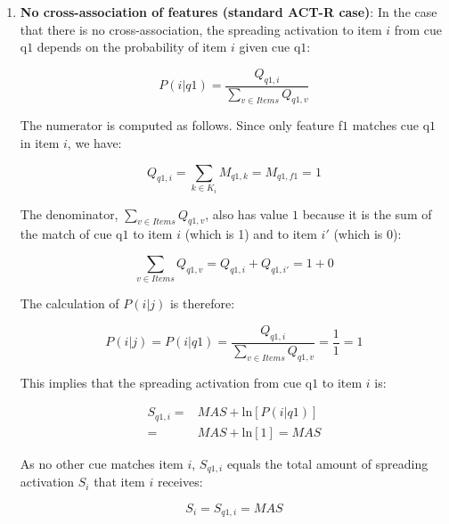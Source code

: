 \documentclass{cambridge7A}\usepackage[]{graphicx}\usepackage[]{color}
\begin{document}
\begin{enumerate}
\item
\textbf{No cross-association of features (standard ACT-R case)}:
In the case that there is no  cross-association, the spreading activation to item $i$ from cue q$1$ depends on the probability of item $i$ given cue q$1$:

\begin{equation} \label{eq:newfannoxassoc2}
	P(i|q1) = \frac{Q_{q1,i}}{\sum\limits_{v\in Items} Q_{q1,v}}
\end{equation}

The numerator is computed as follows. Since only feature f$1$ matches cue q$1$ in item $i$, we have:

\begin{equation}
Q_{q1,i} = \sum_{k \in K_i} M_{q1,k} = M_{q1,f1} = 1
\end{equation}

The denominator, $\sum\limits_{v \in Items} Q_{q1,v}$, also has value $1$ because it is the sum of the match of cue q$1$ to item $i$ (which is 1) and to item $i'$ (which is 0):

\begin{equation}
\sum_{v\in Items} Q_{q1,v} = Q_{q1,i} + Q_{q1,i'} = 1 + 0 
\end{equation}

The  calculation of $P(i|j)$ is therefore:

\begin{equation}
P(i|j) =  P(i|q1) = \frac{Q_{q1,i}}{\sum\limits_{v \in Items} Q_{q1,v}} = \frac{1}{1} = 1 
\end{equation}

This implies that the spreading activation from cue q$1$ to item $i$ is:

\begin{equation}
\begin{split} 
	S_{q1,i} =& \textit{MAS} + \text{ln}[P(i|q1)] \\
	         =& \textit{MAS} + \text{ln}[1] = \textit{MAS}
\end{split}
\end{equation}

As no other cue matches item $i$, $S_{q1,i}$ equals the total amount of spreading activation $S_i$ that item $i$ receives: 

\begin{equation}
	S_{i} = S_{q1,i} = \textit{MAS} 
\end{equation}


\end{enumerate}
\end{document}
